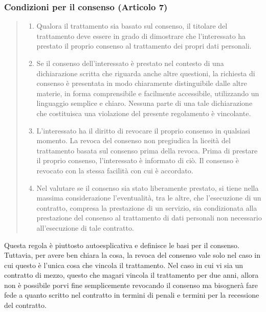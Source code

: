 \subsubsection*{Condizioni per il consenso (Articolo 7)}
\begin{quote}
    \begin{enumerate}
        \item Qualora il trattamento sia basato sul consenso, il titolare del trattamento deve essere in grado di dimostrare che l'interessato ha prestato il proprio consenso al trattamento dei propri dati personali.
        \item Se il consenso dell'interessato è prestato nel contesto di una dichiarazione scritta che riguarda anche altre questioni, la richiesta di consenso è presentata in modo chiaramente distinguibile dalle altre materie, in forma comprensibile e facilmente accessibile, utilizzando un linguaggio semplice e chiaro. Nessuna parte di una tale dichiarazione che costituisca una violazione del presente regolamento è vincolante.
        \item L'interessato ha il diritto di revocare il proprio consenso in qualsiasi momento. La revoca del consenso non pregiudica la liceità del trattamento basata sul consenso prima della revoca. Prima di prestare il proprio consenso, l'interessato è informato di ciò. Il consenso è revocato con la stessa facilità con cui è accordato.
        \item Nel valutare se il consenso sia stato liberamente prestato, si tiene nella massima considerazione l'eventualità, tra le altre, che l'esecuzione di un contratto, compresa la prestazione di un servizio, sia condizionata alla prestazione del consenso al trattamento di dati personali non necessario all'esecuzione di tale contratto.
    \end{enumerate}
\end{quote}
Questa regola è piuttosto autoesplicativa e definisce le basi per il consenso.
Tuttavia, per avere ben chiara la cosa, la revoca del consenso vale solo nel caso in cui questo è l'unica cosa che vincola il trattamento.
Nel caso in cui vi sia un contratto di mezzo, questo che magari vincola il trattamento per due anni, allora non è possibile porvi fine semplicemente revocando il consenso ma bisognerà fare fede a quanto scritto nel contratto in termini di penali e termini per la recessione del contratto.
